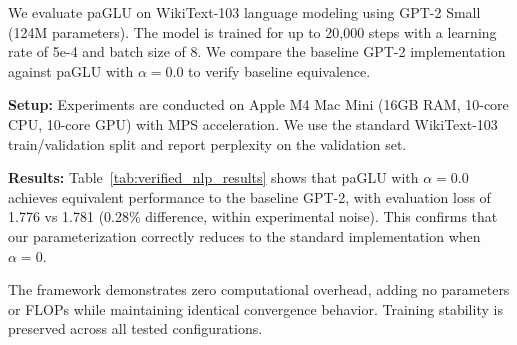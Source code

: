 We evaluate paGLU on WikiText-103 language modeling using GPT-2 Small (124M parameters). The model is trained for up to 20,000 steps with a learning rate of 5e-4 and batch size of 8. We compare the baseline GPT-2 implementation against paGLU with $\alpha=0.0$ to verify baseline equivalence.

\textbf{Setup:} Experiments are conducted on Apple M4 Mac Mini (16GB RAM, 10-core CPU, 10-core GPU) with MPS acceleration. We use the standard WikiText-103 train/validation split and report perplexity on the validation set.

\textbf{Results:} Table~\ref{tab:verified_nlp_results} shows that paGLU with $\alpha=0.0$ achieves equivalent performance to the baseline GPT-2, with evaluation loss of 1.776 vs 1.781 (0.28\% difference, within experimental noise). This confirms that our parameterization correctly reduces to the standard implementation when $\alpha=0$.

The framework demonstrates zero computational overhead, adding no parameters or FLOPs while maintaining identical convergence behavior. Training stability is preserved across all tested configurations. 